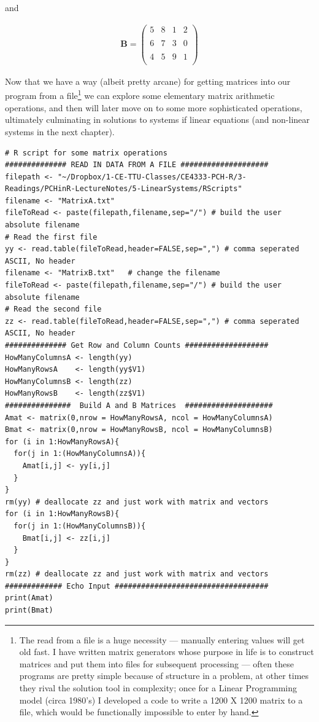 and 

\begin{gather}
\mathbf{B} =
\begin{pmatrix}
5 & 8 & 1 & 2 \\
~\\
6 & 7 & 3 & 0 \\
~\\
4 & 5 & 9 & 1 \\
\end{pmatrix}
\end{gather}

Now that we have a way (albeit pretty arcane) for getting matrices into our program from a file\footnote{The read from a file is a huge necessity --- manually entering values will get old fast.   I have written matrix generators whose purpose in life is to construct matrices and put them into files for subsequent processing --- often these programs are pretty simple because of structure in a problem, at other times they rival the solution tool in complexity; once for a Linear Programming model (circa 1980's) I developed a code to write a 1200 X 1200 matrix to a file, which would be functionally impossible to enter by hand.} we can explore some elementary matrix arithmetic operations, and then will later move on to some more sophisticated operations, ultimately culminating in solutions to systems if linear equations (and non-linear systems in the next chapter).
\newpage
\begin{lstlisting}[caption=R code demonstrating reading in two matrices , label=lst:ReadMatrixNew]
# R script for some matrix operations
############## READ IN DATA FROM A FILE ####################
filepath <- "~/Dropbox/1-CE-TTU-Classes/CE4333-PCH-R/3-Readings/PCHinR-LectureNotes/5-LinearSystems/RScripts"
filename <- "MatrixA.txt"
fileToRead <- paste(filepath,filename,sep="/") # build the user absolute filename
# Read the first file
yy <- read.table(fileToRead,header=FALSE,sep=",") # comma seperated ASCII, No header
filename <- "MatrixB.txt"   # change the filename
fileToRead <- paste(filepath,filename,sep="/") # build the user absolute filename
# Read the second file
zz <- read.table(fileToRead,header=FALSE,sep=",") # comma seperated ASCII, No header
############## Get Row and Column Counts ###################
HowManyColumnsA <- length(yy)
HowManyRowsA    <- length(yy$V1)
HowManyColumnsB <- length(zz)
HowManyRowsB    <- length(zz$V1)
###############  Build A and B Matrices  ####################
Amat <- matrix(0,nrow = HowManyRowsA, ncol = HowManyColumnsA)
Bmat <- matrix(0,nrow = HowManyRowsB, ncol = HowManyColumnsB)
for (i in 1:HowManyRowsA){
  for(j in 1:(HowManyColumnsA)){
    Amat[i,j] <- yy[i,j]
  }
}
rm(yy) # deallocate zz and just work with matrix and vectors 
for (i in 1:HowManyRowsB){
  for(j in 1:(HowManyColumnsB)){
    Bmat[i,j] <- zz[i,j]
  }
}
rm(zz) # deallocate zz and just work with matrix and vectors 
############# Echo Input ###################################
print(Amat)
print(Bmat)
\end{lstlisting}

